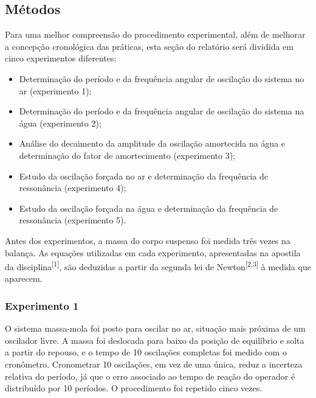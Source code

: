 \documentclass[12pt, a4paper]{article}
\newcommand{\cita}[1]{\textsuperscript{[#1]}}
\begin{document}
\subsection{Métodos}

Para uma melhor compreensão do procedimento experimental, além de melhorar a concepção cronológica das práticas, esta seção do relatório será dividida em cinco experimentos diferentes:
\begin{itemize}
    \item Determinação do período e da frequência angular de oscilação do sistema no ar (experimento 1);
    \item Determinação do período e da frequência angular de oscilação do sistema na água (experimento 2);
    \item Análise do decaimento da amplitude da oscilação amortecida na água e determinação do fator de amortecimento (experimento 3);
    \item Estudo da oscilação forçada no ar e determinação da frequência de ressonância (experimento 4);
    \item Estudo da oscilação forçada na água e determinação da frequência de ressonância (experimento 5).
\end{itemize}

Antes dos experimentos, a massa do corpo suspenso foi medida três vezes na balança. As equações utilizadas em cada experimento, apresentadas na apostila da disciplina\cita{1}, são deduzidas a partir da segunda lei de Newton\cita{2,3} à medida que aparecem.

\subsubsection{Experimento 1}

O sistema massa-mola foi posto para oscilar no ar, situação mais próxima de um oscilador livre. A massa foi deslocada para baixo da posição de equilíbrio e solta a partir do repouso, e o tempo de 10 oscilações completas foi medido com o cronômetro. Cronometrar 10 oscilações, em vez de uma única, reduz a incerteza relativa do período, já que o erro associado ao tempo de reação do operador é distribuído por 10 períodos. O procedimento foi repetido cinco vezes.
\end{document}
